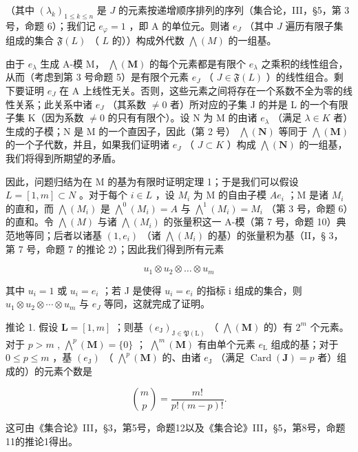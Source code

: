 （其中 \((\lambda_k)_{1 \leqslant k \leqslant n}\) 是 \(J\) 的元素按递增顺序排列的序列（集合论，III，§5，第 3 号，命题 6）；我们记 \(e_\varphi = 1\) ，即 A 的单位元。则诸 \(e_J\) （其中 \(J\) 遍历有限子集组成的集合 \(\mathfrak{F}(L)\) （ \(L\) 的））构成外代数 \(\bigwedge(M)\) 的一组基。

由于 \(e_{\lambda}\) 生成 A-模 M， \(\bigwedge(\mathbf{M})\) 的每个元素都是有限个 \(e_{\lambda}\) 之乘积的线性组合，从而（考虑到第 3 号命题 5）是有限个元素 \(e_{J}\) （ \(J \in \mathfrak{F}(L)\) ）的线性组合。剩下要证明 \(e_{J}\) 在 A 上线性无关。否则，这些元素之间将存在一个系数不全为零的线性关系；此关系中诸 \(e_{J}\) （其系数 \(\neq 0\) 者）所对应的子集 J 的并是 L 的一个有限子集 K（因为系数 \(\neq 0\) 的只有有限个）。设 N 为 M 的由诸 \(e_{\lambda}\) （满足 \(\lambda \in K\) 者）生成的子模；N 是 M 的一个直因子，因此（第 2 号） \(\bigwedge(\mathbf{N})\) 等同于 \(\bigwedge(\mathbf{M})\) 的一个子代数，并且，如果我们证明诸 \(e_{J}\) （ \(J \subset K\) ）构成 \(\bigwedge(\mathbf{N})\) 的一组基，我们将得到所期望的矛盾。

因此，问题归结为在 M 的基为有限时证明定理 1；于是我们可以假设 \(L = [1, m] \subset N\) 。对于每个 \(i \in L\) ，设 \(M_i\) 为 M 的自由子模 \(Ae_i\) ；M 是诸 \(M_i\) 的直和，而 \(\bigwedge(M_i)\) 是 \(\bigwedge^0(M_i) = A\) 与 \(\bigwedge^1(M_i) = M_i\) （第 3 号，命题 6）的直和。令 \(\bigwedge(M)\) 与诸 \(\bigwedge(M_i)\) 的张量积这一 A-模（第 7 号，命题 10）典范地等同；后者以诸基 \((1, e_i)\) （诸 \(\bigwedge(M_i)\) 的基）的张量积为基（II，§ 3，第 7 号，命题 7 的推论 2）；因此我们得到所有元素

\[
u _ {1} \otimes u _ {2} \otimes \dots \otimes u _ {m}
\]

其中 \(u_{i}=1\) 或 \(u_{i}=e_{i}\) ；若 J 是使得 \(u_{i}=e_{i}\) 的指标 i 组成的集合，则 \(u_{1}\otimes u_{2}\otimes\cdots\otimes u_{m}\) 与 \(e_{J}\) 等同，这就完成了证明。

推论 1. 假设 \(\mathbf{L} = [1, m]\) ；则基 \((e_{\mathrm{J}})_{\mathrm{J} \in \mathfrak{P}(\mathrm{L})}\) （ \(\bigwedge (\mathbf{M})\) 的）有 \(2^{m}\) 个元素。对于 \(p > m\) , \(\bigwedge^{p}(\mathbf{M}) = \{0\}\) ； \(\bigwedge^{m}(\mathbf{M})\) 有由单个元素 \(e_{\mathrm{L}}\) 组成的基；对于 \(0 \leqslant p \leqslant m\) ，基 \((e_{\mathrm{J}})\) （ \(\bigwedge^{p}(\mathbf{M})\) 的、由诸 \(e_{\mathrm{J}}\) （满足 \(\operatorname{Card}(\mathbf{J}) = p\) 者）组成的）的元素个数是

\[
\binom {m} {p} = \frac {m !}{p ! (m - p) !}.
\]

这可由《集合论》III，§3，第5号，命题12以及《集合论》III，§5，第8号，命题11的推论1得出。

